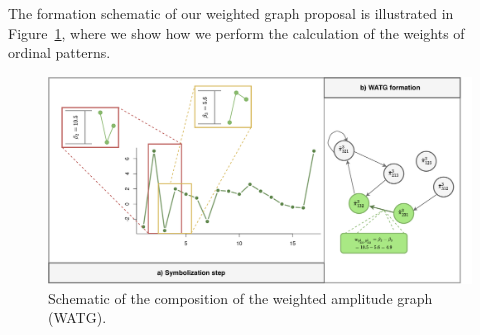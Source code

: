 The formation schematic of our weighted graph proposal is illustrated in Figure~\ref{fig:diagramWATG}, where we show how we perform the calculation of the weights of ordinal patterns.

\begin{figure}
	\includegraphics[width=\columnwidth]{Figures/watg-diagram.pdf}
	\caption{Schematic of the composition of the weighted amplitude graph (WATG).}
	\label{fig:diagramWATG}
\end{figure} 